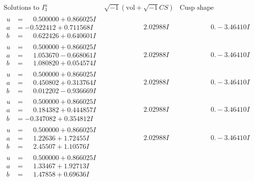 \documentclass[1p]{elsarticle_modified}
\theoremstyle{definition}
\newcommand{\I}{\sqrt{-1}}
\begin{document}
$$\begin{array}{c|c|c}  
\text{Solutions to }I^u_{3}& \I (\text{vol} + \sqrt{-1}CS) & \text{Cusp shape}\\
 \hline 
\begin{aligned}
u &= \phantom{-}0.500000 + 0.866025 I \\
a &= -0.522412 + 0.711568 I \\
b &= \phantom{-}0.622426 + 0.640601 I\end{aligned}
 & \phantom{-0.000000 -}2.02988 I & \phantom{-0.000000 } 0. - 3.46410 I \\ \hline\begin{aligned}
u &= \phantom{-}0.500000 + 0.866025 I \\
a &= \phantom{-}1.053670 - 0.668061 I \\
b &= \phantom{-}1.080820 + 0.054574 I\end{aligned}
 & \phantom{-0.000000 -}2.02988 I & \phantom{-0.000000 } 0. - 3.46410 I \\ \hline\begin{aligned}
u &= \phantom{-}0.500000 + 0.866025 I \\
a &= \phantom{-}0.450802 + 0.313764 I \\
b &= \phantom{-}0.012202 - 0.936669 I\end{aligned}
 & \phantom{-0.000000 -}2.02988 I & \phantom{-0.000000 } 0. - 3.46410 I \\ \hline\begin{aligned}
u &= \phantom{-}0.500000 + 0.866025 I \\
a &= \phantom{-}0.184382 + 0.444857 I \\
b &= -0.347082 + 0.354812 I\end{aligned}
 & \phantom{-0.000000 -}2.02988 I & \phantom{-0.000000 } 0. - 3.46410 I \\ \hline\begin{aligned}
u &= \phantom{-}0.500000 + 0.866025 I \\
a &= \phantom{-}1.22636 + 1.72455 I \\
b &= \phantom{-}2.45507 + 1.10576 I\end{aligned}
 & \phantom{-0.000000 -}2.02988 I & \phantom{-0.000000 } 0. - 3.46410 I \\ \hline\begin{aligned}
u &= \phantom{-}0.500000 + 0.866025 I \\
a &= \phantom{-}1.33467 + 1.92713 I \\
b &= \phantom{-}1.47858 + 0.69636 I\end{aligned}

\end{array}$$
\end{document}
